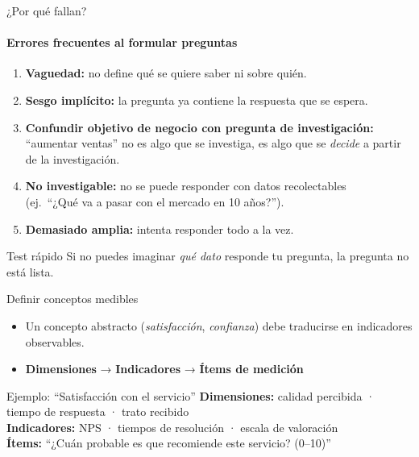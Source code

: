 \documentclass[aspectratio=169, 12pt]{beamer}
\begin{document}
\begin{frame}{¿Por qué fallan?}
  \framesubtitle{Errores frecuentes al formular preguntas}
  \begin{enumerate}
    \item \textbf{Vaguedad:} no define qué se quiere saber ni sobre quién.
    \item \textbf{Sesgo implícito:} la pregunta ya contiene la respuesta que se espera.
    \item \textbf{Confundir objetivo de negocio con pregunta de investigación:}\\
          {\small ``aumentar ventas'' no es algo que se investiga, es algo que se \textit{decide} a partir de la investigación.}
    \item \textbf{No investigable:} no se puede responder con datos recolectables\\
          {\small (ej.\ ``¿Qué va a pasar con el mercado en 10 años?'').}
    \item \textbf{Demasiado amplia:} intenta responder todo a la vez.
  \end{enumerate}
  \vspace{0.3cm}
  \begin{alertblock}{Test rápido}
    Si no puedes imaginar \textit{qué dato} responde tu pregunta, la pregunta no está lista.
  \end{alertblock}
\end{frame}

\begin{frame}{Definir conceptos medibles}
  \begin{itemize}
    \item Un concepto abstracto (\textit{satisfacción}, \textit{confianza}) debe traducirse en indicadores observables.
    \item \textbf{Dimensiones} → \textbf{Indicadores} → \textbf{Ítems de medición}
  \end{itemize}
  \vspace{0.4cm}
  \begin{exampleblock}{Ejemplo: ``Satisfacción con el servicio''}
    \small
    \textbf{Dimensiones:} calidad percibida · tiempo de respuesta · trato recibido\\
    \textbf{Indicadores:} NPS · tiempos de resolución · escala de valoración\\
    \textbf{Ítems:} ``¿Cuán probable es que recomiende este servicio? (0–10)''
  \end{exampleblock}
\end{frame}
\end{document}
